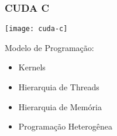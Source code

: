 \documentclass[10pt, compress, aspectratio=43, xcolor={table,usenames,dvipsnames}]{beamer}
\begin{document}
%
%
%

\begin{frame}
    \frametitle{CUDA C}
    \begin{center}
        \texttt{[image: cuda-c]}
    \end{center}
    Modelo de Programação:
    \begin{itemize}
        \item \alert{Kernels}
        \item Hierarquia de \alert{Threads}
        \item Hierarquia de \alert{Memória}
        \item Programação \alert{Heterogênea}
    \end{itemize}
\end{frame}
\end{document}
